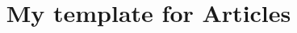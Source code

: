 \documentclass{article}
\begin{document}
\title{My template for Articles}


\maketitle








\end{document}
